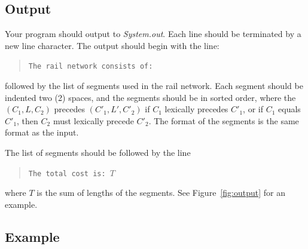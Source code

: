 \documentclass[12pt,pdftex]{article}
\begin{document}
\subsection*{Output}
Your program should output to {\it System.out}.  Each line should be
terminated by a new line character.  The output should begin with the 
line:
\begin{quote}
\tt The rail network consists of:
\end{quote}
followed by the list of segments used in the rail network.  Each
segment should be indented two (2) spaces, and the segments should
be in sorted order, where the $(C_1,L,C_2)$ precedes $(C'_1,L',C'_2)$
if $C_1$ lexically precedes $C'_1$, or if $C_1$ equals $C'_1$, then
$C_2$ must lexically precede $C'_2$.  The format of the segments is the
same format as the input.  

The list of segments should be followed by the line
\begin{quote}
\tt The total cost is: $T$
\end{quote}
where $T$ is the sum of lengths of the segments.
See Figure~\ref{fig:output} for an example.  


\subsection*{Example}
\end{document}
